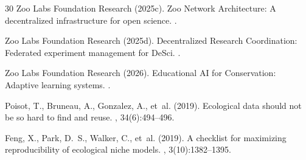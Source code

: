 \begin{thebibliography}{30}
Zoo Labs Foundation Research (2025c).
\newblock Zoo Network Architecture: A decentralized infrastructure for open science.
.

Zoo Labs Foundation Research (2025d).
\newblock Decentralized Research Coordination: Federated experiment management for DeSci.
.

Zoo Labs Foundation Research (2026).
\newblock Educational AI for Conservation: Adaptive learning systems.
.

Poisot, T., Bruneau, A., Gonzalez, A., et~al. (2019).
\newblock Ecological data should not be so hard to find and reuse.
, 34(6):494--496.

Feng, X., Park, D.~S., Walker, C., et~al. (2019).
\newblock A checklist for maximizing reproducibility of ecological niche models.
, 3(10):1382--1395.

\end{thebibliography}

